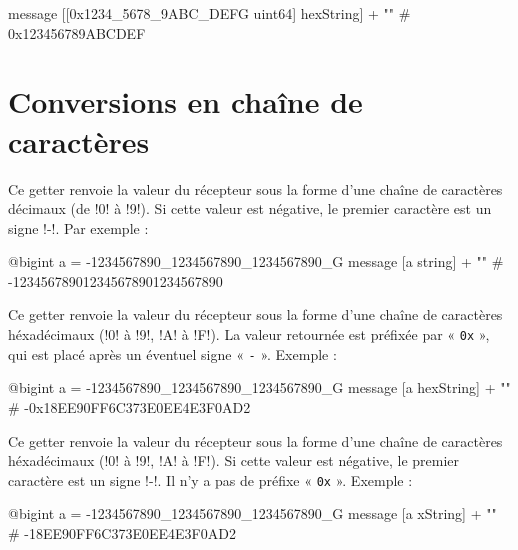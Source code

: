 \begin{galgas}
message [[0x1234_5678_9ABC_DEFG uint64] hexString] + "\n" # 0x123456789ABCDEF
\end{galgas}







\section{Conversions en chaîne de caractères}


Ce getter renvoie la valeur du récepteur sous la forme d'une chaîne de caractères décimaux (de \ggs!0! à \ggs!9!). Si cette valeur est négative, le premier caractère est un signe \ggs!-!. Par exemple :

\begin{galgas}
@bigint a = -1234567890_1234567890_1234567890_G
message [a string] + "\n" # -123456789012345678901234567890
\end{galgas}






Ce getter renvoie la valeur du récepteur sous la forme d'une chaîne de caractères héxadécimaux (\ggs!0! à \ggs!9!, \ggs!A! à \ggs!F!). La valeur retournée est préfixée par « \texttt{0x} », qui est placé après un éventuel signe « \texttt{-} ». Exemple :

\begin{galgas}
@bigint a = -1234567890_1234567890_1234567890_G
message [a hexString] + "\n" # -0x18EE90FF6C373E0EE4E3F0AD2
\end{galgas}









Ce getter renvoie la valeur du récepteur sous la forme d'une chaîne de caractères héxadécimaux (\ggs!0! à \ggs!9!, \ggs!A! à \ggs!F!). Si cette valeur est négative, le premier caractère est un signe \ggs!-!. Il n'y a pas de préfixe « \texttt{0x} ». Exemple :

\begin{galgas}
@bigint a = -1234567890_1234567890_1234567890_G
message [a xString] + "\n" # -18EE90FF6C373E0EE4E3F0AD2
\end{galgas}









